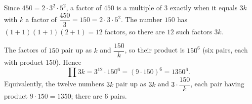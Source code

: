 Since $450=2\cdot3^2\cdot5^2$, a factor of $450$ is a multiple of $3$ exactly when it equals $3k$ with $k$ a factor of $\dfrac{450}{3}=150=2\cdot3\cdot5^2$. The number $150$ has $(1+1)(1+1)(2+1)=12$ factors, so there are $12$ such factors $3k$.

The factors of $150$ pair up as $k$ and $\dfrac{150}{k}$, so their product is $150^{6}$ (six pairs, each with product $150$). Hence
\[
\prod 3k=3^{12}\cdot150^6=(9\cdot150)^6=\boxed{1350^6}.
\]
Equivalently, the twelve numbers $3k$ pair up as $3k$ and $3\cdot\dfrac{150}{k}$, each pair having product $9\cdot150=1350$; there are $6$ pairs.
